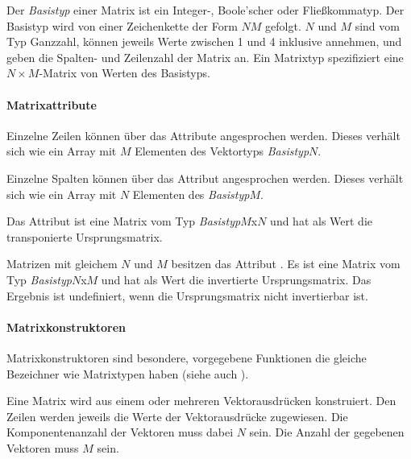 Der \emph{Basistyp} einer Matrix ist ein Integer-, Boole'scher oder Fließkommatyp.
Der Basistyp wird von einer Zeichenkette der Form $N$$M$ gefolgt. $N$ und
$M$ sind vom Typ Ganzzahl, können jeweils Werte zwischen 1 und 4 inklusive annehmen,
und geben die Spalten- und Zeilenzahl
der Matrix an. Ein Matrixtyp spezifiziert eine  $N \times M$-Matrix von Werten des Basistyps.

\paragraph{Matrixattribute}\label{Matrixattribute}

Einzelne Zeilen können über das Attribute  angesprochen werden. Dieses
verhält sich wie ein Array mit $M$ Elementen des Vektortyps \emph{Basistyp}$N$.

Einzelne Spalten können über das Attribut  angesprochen werden. Dieses
verhält sich wie ein Array mit $N$ Elementen des \emph{Basistyp}$M$.

Das Attribut  ist eine Matrix vom Typ \emph{Basistyp}$M$x$N$
und hat als Wert die transponierte Ursprungsmatrix.

Matrizen mit gleichem $N$ und $M$ besitzen das Attribut .
Es ist eine Matrix vom Typ \emph{Basistyp}$N$x$M$ und hat als Wert die invertierte Ursprungsmatrix.
Das Ergebnis ist undefiniert, wenn die Ursprungsmatrix nicht invertierbar ist.

\paragraph{Matrixkonstruktoren}\label{Matrixkonstruktoren}

Matrixkonstruktoren sind besondere, vorgegebene Funktionen die gleiche Bezeichner wie Matrixtypen haben
(siehe auch ).


Eine Matrix wird aus einem oder mehreren Vektorausdrücken konstruiert. Den Zeilen werden
jeweils die Werte der Vektorausdrücke zugewiesen. Die Komponentenanzahl der Vektoren muss dabei
$N$ sein. Die Anzahl der gegebenen Vektoren muss $M$ sein.

